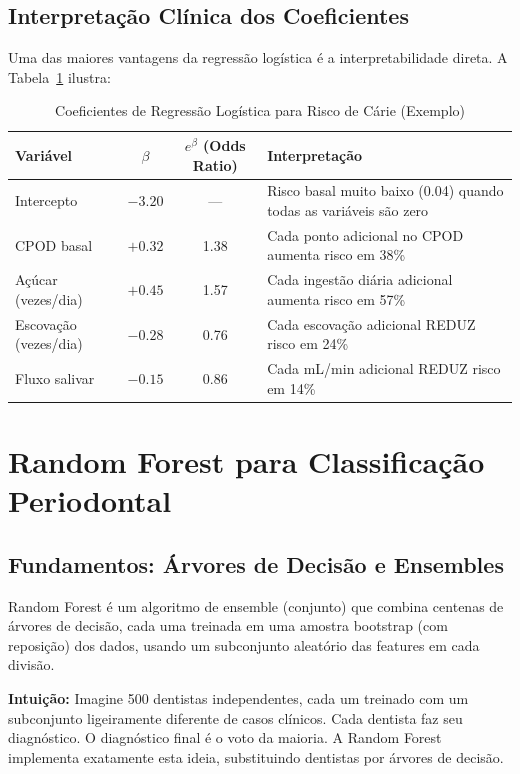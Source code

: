 \subsection{Interpretação Clínica dos Coeficientes}

Uma das maiores vantagens da regressão logística é a interpretabilidade direta. A Tabela~\ref{tab:coeficientes-carie} ilustra:

\begin{table}[H]
  \centering
  \caption{Coeficientes de Regressão Logística para Risco de Cárie (Exemplo)}
  \label{tab:coeficientes-carie}
  \begin{tabularx}{\textwidth}{lccX}
    \toprule
    \textbf{Variável} & $\beta$ & $e^{\beta}$ (Odds Ratio) & \textbf{Interpretação} \\
    \midrule
    Intercepto & $-3.20$ & — & Risco basal muito baixo (0.04) quando todas as variáveis são zero \\
    CPOD basal & $+0.32$ & 1.38 & Cada ponto adicional no CPOD aumenta risco em 38\% \\
    Açúcar (vezes/dia) & $+0.45$ & 1.57 & Cada ingestão diária adicional aumenta risco em 57\% \\
    Escovação (vezes/dia) & $-0.28$ & 0.76 & Cada escovação adicional REDUZ risco em 24\% \\
    Fluxo salivar & $-0.15$ & 0.86 & Cada mL/min adicional REDUZ risco em 14\% \\
    \bottomrule
  \end{tabularx}
\end{table}

\section{Random Forest para Classificação Periodontal}

\subsection{Fundamentos: Árvores de Decisão e Ensembles}

Random Forest  é um algoritmo de ensemble (conjunto) que combina centenas de árvores de decisão, cada uma treinada em uma amostra bootstrap (com reposição) dos dados, usando um subconjunto aleatório das features em cada divisão.

\textbf{Intuição:} Imagine 500 dentistas independentes, cada um treinado com um subconjunto ligeiramente diferente de casos clínicos. Cada dentista faz seu diagnóstico. O diagnóstico final é o voto da maioria. A Random Forest implementa exatamente esta ideia, substituindo dentistas por árvores de decisão.

